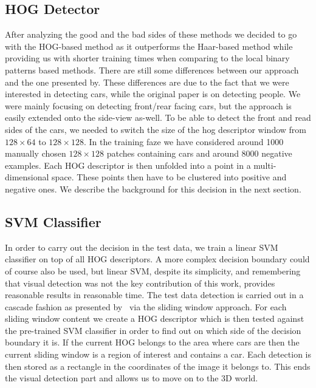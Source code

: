     \subsection{HOG Detector}\label{sub:hog_detector}
        After analyzing the good and the bad sides of these methods we decided to go with the HOG-based method as it outperforms the Haar-based method while providing us with shorter training times when comparing to the local binary patterns based methods.
        There are still some differences between our approach and the one presented by\cite{dalal2005}. These differences are due to the fact that we were interested in detecting cars, while the original paper is on detecting people.
        We were mainly focusing on detecting front/rear facing cars, but the approach is easily extended onto the side-view as-well.
        To be able to detect the front and read sides of the cars, we needed to switch the size of the hog descriptor window from $128 \times 64$ to $128 \times 128$.
        In the training faze we have considered around 1000 manually chosen $128 \times 128$ patches containing cars and around 8000 negative examples. Each HOG descriptor is then unfolded into a point in a multi-dimensional space. These points then have to be clustered into positive and negative ones. We describe the background for this decision in the next section.

    \subsection{SVM Classifier}\label{sub:svm_classifier}
        In order to carry out the decision in the test data, we train a linear SVM classifier on top of all HOG descriptors.
        A more complex decision boundary could of course also be used, but linear SVM, despite its simplicity, and remembering that visual detection was not the key contribution of this work, provides reasonable results in reasonable time.
        The test data detection is carried out in a cascade fashion as presented by~\cite{violajones2001} via the sliding window approach. For each sliding window content we create a HOG descriptor which is then tested against the pre-trained SVM classifier in order to find out on which side of the decision boundary it is. If the current HOG belongs to the area where cars are then the current sliding window is a region of interest and contains a car.
        Each detection is then stored as a rectangle in the coordinates of the image it belongs to.
        This ends the visual detection part and allows us to move on to the 3D world.

